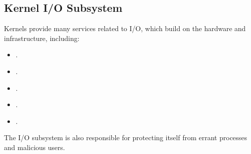 \subsection{Kernel I/O Subsystem}\label{subsec:Kernel_IO_Subsystem}
Kernels provide many services related to I/O, which build on the hardware and  infrastructure, including:
\begin{itemize}[noitemsep]
\item {}.
\item {}.
\item {}.
\item {}.
\item {}.
\end{itemize}

The I/O subsystem is also responsible for protecting itself from errant processes and malicious users.


